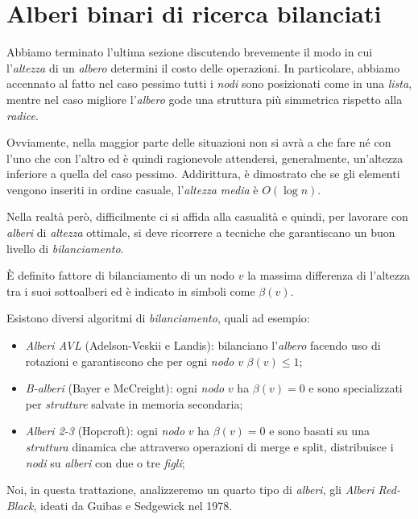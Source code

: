 \section{Alberi binari di ricerca bilanciati}
Abbiamo terminato l'ultima sezione discutendo brevemente il modo in cui
l'\emph{altezza} di un \emph{albero} determini il costo delle operazioni. In
particolare, abbiamo accennato al fatto nel caso pessimo tutti i \emph{nodi}
sono posizionati come in una \emph{lista}, mentre nel caso migliore
l'\emph{albero} gode una struttura più simmetrica rispetto alla \emph{radice}.

Ovviamente, nella maggior parte delle situazioni non si avrà a che fare né con
l'uno che con l'altro ed è quindi ragionevole attendersi, generalmente,
un'altezza inferiore a quella del caso pessimo. Addirittura, è dimostrato che
se gli elementi vengono inseriti in ordine casuale, l'\emph{altezza media} è
$O(\log n)$.

Nella realtà però, difficilmente ci si affida alla casualità e quindi, per
lavorare con \emph{alberi} di \emph{altezza} ottimale, si deve ricorrere a
tecniche che garantiscano un buon livello di \emph{bilanciamento}.

\begin{definition}
    È definito fattore di bilanciamento di un nodo $v$ la massima differenza
    di l'altezza tra i suoi sottoalberi ed è indicato in simboli come $\beta(v)$.
\end{definition}\noindent
Esistono diversi algoritmi di \emph{bilanciamento}, quali ad esempio:
\begin{itemize}
    \item \emph{Alberi AVL} (Adelson-Veskii e Landis): bilanciano l'\emph{albero}
    facendo uso di rotazioni e garantiscono che per ogni \emph{nodo} $v$
    $\beta(v)\leq1$;
    \item \emph{B-alberi} (Bayer e McCreight): ogni \emph{nodo} $v$ ha
    $\beta(v)=0$ e sono specializzati per \emph{strutture} salvate in memoria
    secondaria;
    \item \emph{Alberi 2-3} (Hopcroft): ogni \emph{nodo} $v$ ha $\beta(v)=0$ e
    sono basati su una \emph{struttura} dinamica che attraverso operazioni di
    merge e split, distribuisce i \emph{nodi} su \emph{alberi} con due o tre
    \emph{figli};
\end{itemize}
Noi, in questa trattazione, analizzeremo un quarto tipo di \emph{alberi}, gli
\emph{Alberi Red-Black}, ideati da Guibas e Sedgewick nel 1978.

